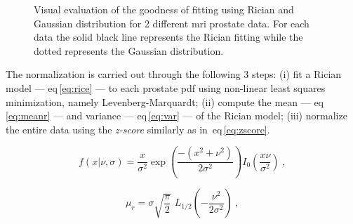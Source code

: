\begin{figure}
  \centering
  \hfill
  \hfill
  \caption[Visual evaluation of the goodness of fitting using Rician and Gaussian distribution for 2 different \acs*{mri} prostate data.]{Visual evaluation of the goodness of fitting using Rician and Gaussian distribution for 2 different \acs*{mri} prostate data. For each data the solid black line represents the Rician fitting while the dotted represents the Gaussian distribution.}
  \label{fig:fitting}
\end{figure}

The normalization is carried out through the following 3 steps: 
(i) fit a Rician model --- \acs{eq}\,\eqref{eq:rice} --- to each prostate \ac{pdf} using non-linear least squares minimization, namely Levenberg-Marquardt; 
(ii) compute the mean --- \acs{eq}\,\eqref{eq:meanr} --- and variance --- \acs{eq}\,\eqref{eq:var} --- of the Rician model;
(iii) normalize the entire data using the \textit{z-score} similarly as in~\acs{eq}\,\eqref{eq:zscore}.

\begin{equation}
  f(x| \nu, \sigma) = \frac{x}{\sigma^2}\exp\left( \frac{- (x^2 + \nu^2)}{2\sigma^2} \right) I_0 \left( \frac{x \nu}{\sigma^2} \right) \ ,
  \label{eq:rice}
\end{equation}

\begin{equation}
  \mu_{r} = \sigma  \sqrt{\frac{\pi}{2}}\,\,L_{1/2}(-\frac{\nu^2}{2\sigma^2})  \ ,
  \label{eq:meanr}
\end{equation}

